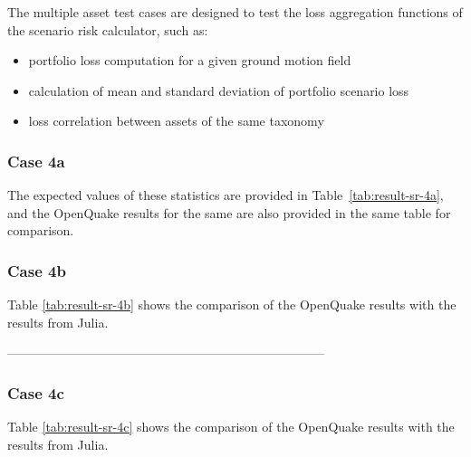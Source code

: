 The multiple asset test cases are designed to test the loss aggregation functions of the scenario risk calculator, such as:

\begin{itemize}
\item portfolio loss computation for a given ground motion field
\item calculation of mean and standard deviation of portfolio scenario loss
\item loss correlation between assets of the same taxonomy
\end{itemize}

\subsubsection{Case 4a}


 The expected values of these statistics are provided in Table~\ref{tab:result-sr-4a}, and the OpenQuake results for the same are also provided in the same table for comparison.

\subsubsection{Case 4b}


Table \ref{tab:result-sr-4b} shows the comparison of the OpenQuake results with the results from Julia.

---------------------------------------------------------------------------
\subsubsection{Case 4c}


Table \ref{tab:result-sr-4c} shows the comparison of the OpenQuake results with the results from Julia.

% 
% 

